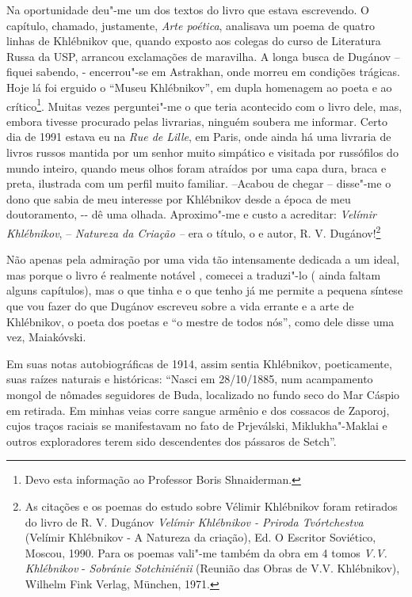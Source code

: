 Na oportunidade deu"-me um dos textos do livro que estava escrevendo. O
capítulo, chamado, justamente, \emph{Arte poética}, analisava um poema
de quatro linhas de Khlébnikov que, quando exposto aos colegas do curso
de Literatura Russa da USP, arrancou exclamações de maravilha. A longa
busca de Dugánov -- fiquei sabendo, - encerrou"-se em Astrakhan, onde
morreu em condições trágicas. Hoje lá foi erguido o ``Museu
Khlébnikov'', em dupla homenagem ao poeta e ao crítico\footnote{Devo
  esta informação ao Professor Boris Shnaiderman.}. Muitas vezes
perguntei"-me o que teria acontecido com o livro dele, mas, embora
tivesse procurado pelas livrarias, ninguém soubera me informar. Certo
dia de 1991 estava eu na \emph{Rue de Lille}, em Paris, onde ainda há
uma livraria de livros russos mantida por um senhor muito simpático e
visitada por russófilos do mundo inteiro, quando meus olhos foram
atraídos por uma capa dura, braca e preta, ilustrada com um perfil muito
familiar. --Acabou de chegar -- disse"-me o dono que sabia de meu
interesse por Khlébnikov desde a época de meu doutoramento, -\/- dê uma
olhada. Aproximo"-me e custo a acreditar: \emph{Velímir Khlébnikov}, --
\emph{Natureza da Criação --} era o título, o e autor, R. V.
Dugánov!\footnote{As citações e os poemas do estudo sobre Vélimir
  Khlébnikov foram retirados do livro de R. V. Dugánov \emph{Velímir
  Khlébnikov - Priroda Tvórtchestva} (Velímir Khlébnikov - A Natureza da
  criação), Ed. O Escritor Soviético, Moscou, 1990. Para os poemas
  vali"-me também da obra em 4 tomos \emph{V.V. Khlébnikov} -
  \emph{Sobránie Sotchiniénii} (Reunião das Obras de V.V. Khlébnikov),
  Wilhelm Fink Verlag, München, 1971.}

Não apenas pela admiração por uma vida tão intensamente dedicada a um
ideal, mas porque o livro é realmente notável , comecei a traduzi"-lo (
ainda faltam alguns capítulos), mas o que tinha e o que tenho já me
permite a pequena síntese que vou fazer do que Dugánov escreveu sobre a
vida errante e a arte de Khlébnikov, o poeta dos poetas e ``o mestre de
todos nós'', como dele disse uma vez, Maiakóvski.

Em suas notas autobiográficas de 1914, assim sentia Khlébnikov,
poeticamente, suas raízes naturais e históricas: ``Nasci em 28/10/1885,
num acampamento mongol de nômades seguidores de Buda, localizado no
fundo seco do Mar Cáspio em retirada. Em minhas veias corre sangue
armênio e dos cossacos de Zaporoj, cujos traços raciais se manifestavam
no fato de Prjeválski, Miklukha"-Maklai e outros exploradores terem sido
descendentes dos pássaros de Setch''.

